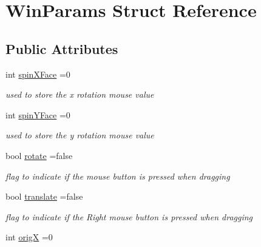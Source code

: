 \hypertarget{structWinParams}{\section{Win\-Params Struct Reference}
\label{structWinParams}
}
\subsection*{Public Attributes}
\begin{DoxyCompactItemize}
\item 
\hypertarget{structWinParams_ae834d382a91e06699778caf8abf8b6a0}{int \hyperlink{structWinParams_ae834d382a91e06699778caf8abf8b6a0}{spin\-X\-Face} =0}\label{structWinParams_ae834d382a91e06699778caf8abf8b6a0}

\begin{DoxyCompactList}\small\item\em used to store the x rotation mouse value \end{DoxyCompactList}\item 
\hypertarget{structWinParams_adf538a60ecec846bb85fb790cdf02ef6}{int \hyperlink{structWinParams_adf538a60ecec846bb85fb790cdf02ef6}{spin\-Y\-Face} =0}\label{structWinParams_adf538a60ecec846bb85fb790cdf02ef6}

\begin{DoxyCompactList}\small\item\em used to store the y rotation mouse value \end{DoxyCompactList}\item 
\hypertarget{structWinParams_a255e3c376110315e2a4ff63ccc312360}{bool \hyperlink{structWinParams_a255e3c376110315e2a4ff63ccc312360}{rotate} =false}\label{structWinParams_a255e3c376110315e2a4ff63ccc312360}

\begin{DoxyCompactList}\small\item\em flag to indicate if the mouse button is pressed when dragging \end{DoxyCompactList}\item 
\hypertarget{structWinParams_adcfa86195240b478c94bfecc5e33e8e7}{bool \hyperlink{structWinParams_adcfa86195240b478c94bfecc5e33e8e7}{translate} =false}\label{structWinParams_adcfa86195240b478c94bfecc5e33e8e7}

\begin{DoxyCompactList}\small\item\em flag to indicate if the Right mouse button is pressed when dragging \end{DoxyCompactList}\item 
\hypertarget{structWinParams_ab9ddf234ba11eb4460eb48469cd73c3a}{int \hyperlink{structWinParams_ab9ddf234ba11eb4460eb48469cd73c3a}{orig\-X} =0}\label{structWinParams_ab9ddf234ba11eb4460eb48469cd73c3a}


\end{DoxyCompactItemize}

